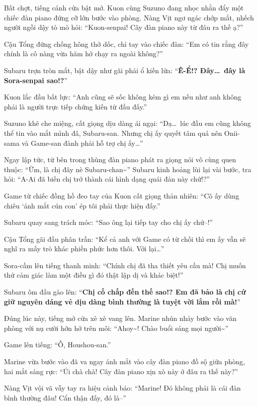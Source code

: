 \documentclass[../main.tex]{subfiles}
\begin{document}
Bất chợt, tiếng cánh cửa bật mở. Kuon cùng Suzuno đang nhọc nhằn đẩy một chiếc đàn piano đứng cỡ lớn bước vào phòng. Nàng Vịt ngơ ngác chớp mắt, nhếch người ngồi dậy tò mò hỏi: ``Kuon-senpai! Cây đàn piano này từ đâu ra thế ạ?''

Cậu Tổng đứng chống hông thở dốc, chỉ tay vào chiếc đàn: ``Em có tin rằng đây chính là cô nàng vừa hăm hở chạy ra ngoài không?''

Subaru trợn tròn mắt, bật dậy như gãi phải ổ kiến lửa: ``\textbf{Ê-Ể!? Đây\dots\ đây là Sora-senpai sao!?}''

Kuon lắc đầu bất lực: ``Anh cũng sẽ sốc không kém gì em nếu như anh không phải là người trực tiếp chứng kiến từ đầu đấy.''

Suzuno khẽ che miệng, cất giọng dịu dàng ái ngại: ``Dạ\dots\ lúc đầu em cũng không thể tin vào mắt mình đâ, Subaru-san. Nhưng chị ấy quyết tâm quá nên Onii-sama và Game-san đành phải hỗ trợ chị ấy\dots''

Ngay lập tức, từ bên trong thùng đàn piano phát ra giọng nói vô cùng quen thuộc: ``Ừm, là chị đây nè Subaru-chan\~{}'' Subaru kinh hoảng lùi lại vài bước, tra hỏi: ``A-Ai đã biến chị trở thành cái hình dạng quái đản này chứ!?''

Game từ chiếc đồng hồ đeo tay của Kuon cất giọng thản nhiên: ``Cô ấy dùng chiêu `ánh mắt cún con' ép tôi phải thực hiện đấy.''

Subaru quay sang trách móc: ``Sao ông lại tiếp tay cho chị ấy chứ--!''

Cậu Tổng gãi đầu phân trần: ``Kể cả anh với Game có từ chối thì em ấy vẫn sẽ nghĩ ra mấy trò khác phiền phức hơn thôi. Với lại\dots''

Sora-cầm lên tiếng thanh minh: ``Chính chị đã tha thiết yêu cầu mà! Chị muốn thử cảm giác làm một điều gì đó thật lập dị và khác biệt!''

Subaru ôm đầu gào lên: ``\textbf{Chị cố chấp đến thế sao!? Em đã bảo là chị cứ giữ nguyên dáng vẻ dịu dàng bình thường là tuyệt vời lắm rồi mà!}''

Đúng lúc này, tiếng mở cửa xè xè vang lên. Marine nhún nhảy bước vào văn phòng với nụ cười hớn hở trên môi: ``Ahoy\~{}! Chào buổi sáng mọi người\~{}''

Game lên tiếng: ``Ồ, Houshou-san.''

Marine vừa bước vào đã va ngay ánh mắt vào cây đàn piano đồ sộ giữa phòng, hai mắt sáng rực: ``Úi chà chà! Cây đàn piano xịn xò này ở đâu ra thế này?''

Nàng Vịt vội vã vẫy tay ra hiệu cảnh báo: ``Marine! Đó không phải là cái đàn bình thường đâu! Cẩn thận đấy, đó là--''
\end{document}
